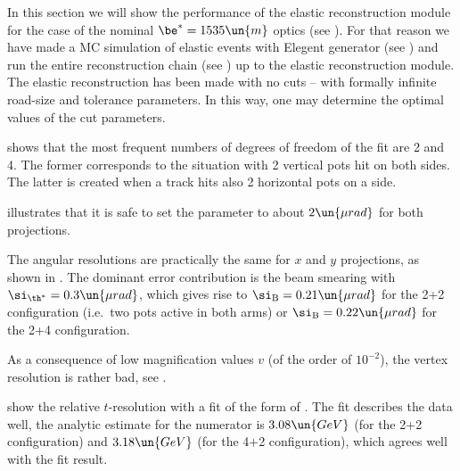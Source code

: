 In this section we will show the performance of the elastic reconstruction module for the case of the nominal $\be^* = 1535\un{m}$ optics (see ). For that reason we have made a MC simulation of elastic events with Elegent generator (see ) and run the entire reconstruction chain (see ) up to the elastic reconstruction module. The elastic reconstruction has been made with no cuts -- with formally infinite road-size and tolerance parameters. In this way, one may determine the optimal values of the cut parameters.

 shows that the most frequent numbers of degrees of freedom of the fit  are 2 and 4. The former corresponds to the situation with 2 vertical pots hit on both sides. The latter is created when a track hits also 2 horizontal pots on a side.

 illustrates that it is safe to set the  parameter to about $2\un{\mu rad}$ for both projections.

\bmfig
{}
\emfig

The angular resolutions are practically the same for $x$ and $y$ projections, as shown in . The dominant error contribution is the beam smearing with $\si_{\th^*} = 0.3\un{\mu rad}$, which gives rise to $\si_{\rm B} = 0.21 \un{\mu rad}$ for the 2+2 configuration (i.e.~two pots active in both arms) or $\si_{\rm B} = 0.22\un{\mu rad}$ for the 2+4 configuration.

As a consequence of low magnification values $v$ (of the order of $10^{-2}$), the vertex resolution is rather bad, see .

\bmfig
{}
\emfig

 show the relative $t$-resolution with a fit of the form of . The fit describes the data well, the analytic estimate for the numerator is $3.08\un{GeV}$ (for the 2+2 configuration) and $3.18\un{GeV}$ (for the 4+2 configuration), which agrees well with the fit result.



